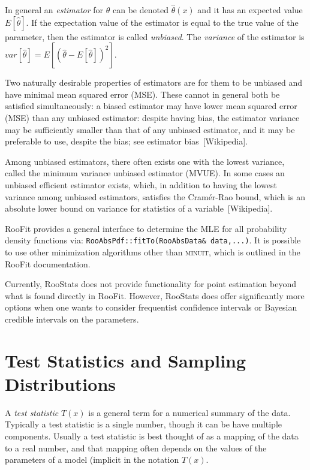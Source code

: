\documentclass[11pt]{article}
\begin{document}
In general an \textit{estimator} for $\theta$ can be denoted $\hat{\theta}(x)$ and it has an expected value $E[\hat{\theta}]$.  If the expectation value of the estimator is equal to the true value of the parameter, then the estimator is called \textit{unbiased}.   The \textit{variance} of the estimator is $var[\hat\theta] = E[ (\hat\theta - E[\hat\theta])^2]$.  

Two naturally desirable properties of estimators are for them to be unbiased and have minimal mean squared error (MSE). These cannot in general both be satisfied simultaneously: a biased estimator may have lower mean squared error (MSE) than any unbiased estimator: despite having bias, the estimator variance may be sufficiently smaller than that of any unbiased estimator, and it may be preferable to use, despite the bias; see estimator bias~[Wikipedia].

Among unbiased estimators, there often exists one with the lowest variance, called the minimum variance unbiased estimator (MVUE). In some cases an unbiased efficient estimator exists, which, in addition to having the lowest variance among unbiased estimators, satisfies the Cram\'er-Rao bound, which is an absolute lower bound on variance for statistics of a variable~[Wikipedia].

RooFit provides a general interface to determine the MLE for all probability density functions via: \texttt{RooAbsPdf::fitTo(RooAbsData\& data,...)}.  It is possible to use other minimization algorithms other than \textsc{minuit}, which is outlined in the RooFit documentation.

Currently, RooStats does not provide functionality for point estimation beyond what is found directly in RooFit.  However, RooStats does offer significantly more options when one wants to consider frequentist confidence intervals or Bayesian credible intervals on the parameters.

\section{Test Statistics and Sampling Distributions}

A \textit{test statistic} $T(x)$ is a general term for a numerical summary of the data.  Typically a test statistic is a single number, though it can be have multiple components.  Usually a test statistic is best thought of as a mapping of the data to a real number, and that mapping often depends on the values of the parameters of a model (implicit in the notation $T(x)$.  
\end{document}
